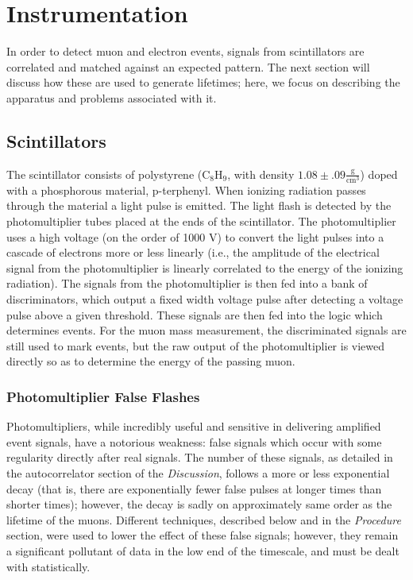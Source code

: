 \section{Instrumentation}
\label{Instrumentation}

In order to detect muon and electron events, signals from scintillators are correlated and matched against an expected pattern. The next section will discuss how these are used to generate lifetimes; here, we focus on describing the apparatus and problems associated with it.

\subsection{Scintillators}
\label{Scintillators}

The scintillator consists of polystyrene ($\mathrm{C}_{8}\mathrm{H}_{9}$, with density $1.08 \pm .09 \frac{\mathrm{g}}{\mathrm{cm}^{3}}$) doped with a phosphorous material, p-terphenyl. When ionizing radiation passes through the material a light pulse is emitted. The light flash is detected by the photomultiplier tubes placed at the ends of the scintillator. The photomultiplier uses a high voltage (on the order of 1000 V) to convert the light pulses into a cascade of electrons more or less linearly (i.e., the amplitude of the electrical signal from the photomultiplier is linearly correlated to the energy of the ionizing radiation). The signals from the photomultiplier is then fed into a bank of discriminators, which output a fixed width voltage pulse after detecting a voltage pulse above a given threshold. These signals are then fed into the logic which determines events. For the muon mass measurement, the discriminated signals are still used to mark events, but the raw output of the photomultiplier is viewed directly so as to determine the energy of the passing muon.

\subsubsection{Photomultiplier False Flashes}
\label{Photomultiplier False Flashes}

Photomultipliers, while incredibly useful and sensitive in delivering amplified event signals, have a notorious weakness: false signals which occur with some regularity directly after real signals. The number of these signals, as detailed in the autocorrelator section of the \emph{Discussion}, follows a more or less exponential decay (that is, there are exponentially fewer false pulses at longer times than shorter times); however, the decay is sadly on approximately same order as the lifetime of the muons. Different techniques, described below and in the \emph{Procedure} section, were used to lower the effect of these false signals; however, they remain a significant pollutant of data in the low end of the timescale, and must be dealt with statistically.

